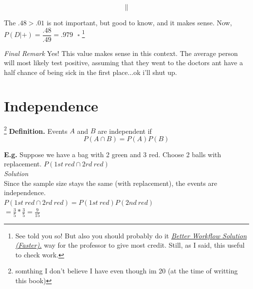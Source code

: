 \documentclass[12pt]{book}
\begin{document}
$$\parallel$$
\begin{center}
\end{center}
The $.48>.01$ is not important, but good to know, and it makes sense. Now,
$P(D|+)=\dfrac{\boxed{.48}}{\mathbf{.49}}=.979~~~\square$
\footnote{See told you so! But also you should probably do it \hyperlink{better workflow solution faster}{\textit{Better Workflow Solution (Faster).}} way for the professor to give most credit. Still, as I said, this useful to check work.}

\noindent \textit{Final Remark} 
Yes! This value makes sense in this context. The average person will most likely test positive, assuming that they went to the doctors ant have a half chance of being sick in the first place...ok i'll shut up.







\section{Independence}\footnote{somthing I don't believe I have even though im 20 (at the time of writting this book)}
\textbf{Definition.} Events $A$ and $B$ are independent if 
$$\boxed{P(A\cap B)=P(A)P(B)}$$

\textbf{E.g.} Suppose we have a bag with 2 green and 3 red. Choose 2 balls with replacement. $P(1st~ red \cap 2rd ~red)$\\
\textit{Solution} \\
Since the sample size stays the same (with replacement), the events are independence.\\
$P(1st~ red \cap 2rd ~red)=P(1st~red)P(2nd~red)$\\
$=\frac{3}{5} * \frac{3}{5}=\frac{9}{15}$\\
\end{document}
